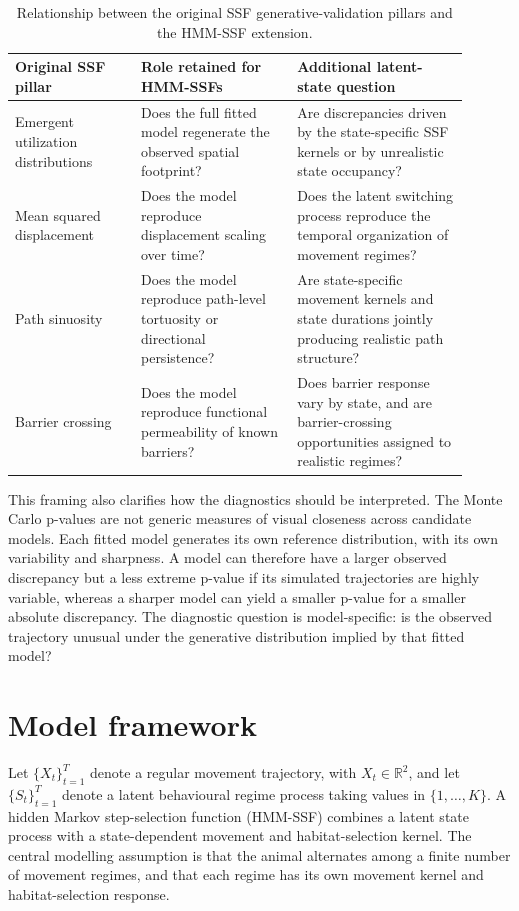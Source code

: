 \documentclass[11pt]{article}
\newcommand{\R}{\mathbb{R}}
\begin{document}
\begin{table}[ht]
\centering
\caption{Relationship between the original SSF generative-validation pillars and the HMM-SSF extension.}
\label{tab:ssf-to-hmm-extension}
\begin{tabular}{p{0.25\linewidth}p{0.31\linewidth}p{0.34\linewidth}}
\toprule
Original SSF pillar & Role retained for HMM-SSFs & Additional latent-state question \\
\midrule
Emergent utilization distributions & Does the full fitted model regenerate the observed spatial footprint? & Are discrepancies driven by the state-specific SSF kernels or by unrealistic state occupancy? \\
Mean squared displacement & Does the model reproduce displacement scaling over time? & Does the latent switching process reproduce the temporal organization of movement regimes? \\
Path sinuosity & Does the model reproduce path-level tortuosity or directional persistence? & Are state-specific movement kernels and state durations jointly producing realistic path structure? \\
Barrier crossing & Does the model reproduce functional permeability of known barriers? & Does barrier response vary by state, and are barrier-crossing opportunities assigned to realistic regimes? \\
\bottomrule
\end{tabular}
\end{table}

This framing also clarifies how the diagnostics should be interpreted. The
Monte Carlo p-values are not generic measures of visual closeness across
candidate models. Each fitted model generates its own reference distribution,
with its own variability and sharpness. A model can therefore have a larger
observed discrepancy but a less extreme p-value if its simulated trajectories
are highly variable, whereas a sharper model can yield a smaller p-value for a
smaller absolute discrepancy. The diagnostic question is model-specific:
is the observed trajectory unusual under the generative distribution implied by
that fitted model?

\section{Model framework}

Let $\{X_t\}_{t=1}^T$ denote a regular movement trajectory, with
$X_t \in \R^2$, and let $\{S_t\}_{t=1}^T$ denote a latent behavioural regime
process taking values in $\{1,\ldots,K\}$. A hidden Markov step-selection
function (HMM-SSF) combines a latent state process with a state-dependent
movement and habitat-selection kernel. The central modelling assumption is
that the animal alternates among a finite number of movement regimes, and that
each regime has its own movement kernel and habitat-selection response.
\end{document}
